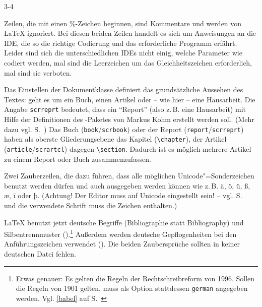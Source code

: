 \begin{labeling}{3-4}

 \item[1-2] Zeilen, die mit einen \%-Zeichen beginnen, sind Kommentare und
   werden von \LaTeX{} ignoriert. Bei diesen beiden Zeilen handelt es sich
   um Anweisungen an die IDE, die so die richtige Codierung und das
   erforderliche Programm erfährt.  Leider sind sich die unterschiedlichen
   IDEs nicht einig, welche Parameter wie codiert werden, mal sind die
   Leerzeichen um das Gleichheitszeichen erforderlich, mal sind sie
   verboten.

 \item[3] Das Einstellen der Dokumentklasse definiert das grundsätzliche
   Aussehen des Textes: geht es um ein Buch, einen Artikel oder -- wie hier
   -- eine Hausarbeit.  Die Angabe \lstinline/scrreprt/ bedeutet, dass ein
   \enquote{Report} (also z.\,B. eine Hausarbeit) mit Hilfe der Definitionen
   des \KOMAScript-Paketes von Markus Kohm erstellt werden soll.  (Mehr dazu
   vgl. S.~\pageref{komaskript}) Das Buch (\lstinline/book//\lstinline/scrbook/)
   oder der Report  (\lstinline/report//\lstinline/scrreprt/) haben
   als oberste Gliederungsebene das Kapitel (\lstinline/\chapter/), der Artikel
   (\lstinline/article//\lstinline/scrartcl/) dagegen \lstinline/\section/.
   Dadurch ist es möglich mehrere Artikel zu einem Report oder Buch zusammenzufassen.
 
 \item[5-6] Zwei Zauberzeilen, die dazu führen, dass alle möglichen
   Unicode"=Sonderzeichen benutzt werden dürfen und auch ausgegeben werden
   können wie z.\,B. ä, ö, ü, ß, æ, ï oder þ.  (Achtung! Der Editor muss auf
   Unicode eingestellt sein! -- vgl. S.~\pageref{unicode} und die verwendete
   Schrift muss die Zeichen enthalten.)
 
 \item[8-9] \LaTeX{} benutzt jetzt deutsche Begriffe (Bibliographie statt
   Bibliography) und Silbentrennmuster ().\footnote{Etwas
   genauer: Es gelten die Regeln der Rechtschreibreform von 1996.
   Sollen die Regeln von 1901 gelten, muss als Option stattdessen
   \lstinline/german/ angegeben werden. Vgl. \ref{babel} auf
   S.~\pageref{babel}} Außerdem werden deutsche Gepflogenheiten bei
   den Anführungszeichen verwendet ().  Die beiden
   Zaubersprüche sollten in keiner deutschen Datei fehlen.
 

\end{labeling}
